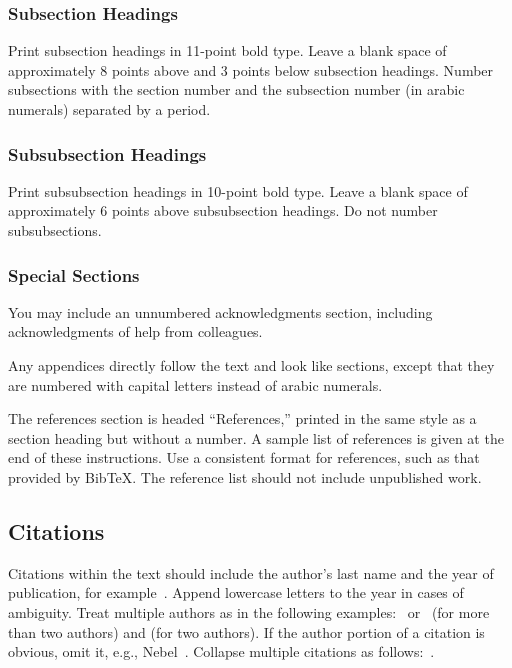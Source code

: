 \documentclass{article}
\begin{document}
\subsubsection{Subsection Headings}

Print subsection headings in 11-point bold type. Leave a blank space
of approximately 8 points above and 3 points below subsection
headings. Number subsections with the section number and the
subsection number (in arabic numerals) separated by a
period.

\subsubsection{Subsubsection Headings}

Print subsubsection headings in 10-point bold type. Leave a blank
space of approximately 6 points above subsubsection headings. Do not
number subsubsections.

\subsubsection{Special Sections}

You may include an unnumbered acknowledgments section, including
acknowledgments of help from colleagues.

Any appendices directly follow the text and look like sections, except
that they are numbered with capital letters instead of arabic
numerals.

The references section is headed ``References,'' printed in the same
style as a section heading but without a number. A sample list of
references is given at the end of these instructions. Use a consistent
format for references, such as that provided by Bib\TeX{}. The reference
list should not include unpublished work.

\subsection{Citations}

Citations within the text should include the author's last name and
the year of publication, for example~\cite{gottlob:nonmon}.  Append
lowercase letters to the year in cases of ambiguity.  Treat multiple
authors as in the following examples:~\cite{abelson-et-al:scheme}
or~\cite{bgf:Lixto} (for more than two authors) and
\cite{brachman-schmolze:kl-one} (for two authors).  If the author
portion of a citation is obvious, omit it, e.g.,
Nebel~.  Collapse multiple citations as
follows:~\cite{gls:hypertrees,levesque:functional-foundations}.
\nocite{abelson-et-al:scheme}
\nocite{bgf:Lixto}
\nocite{brachman-schmolze:kl-one}
\nocite{gottlob:nonmon}
\nocite{gls:hypertrees}
\nocite{levesque:functional-foundations}
\nocite{levesque:belief}
\nocite{nebel:jair-2000}
\end{document}

